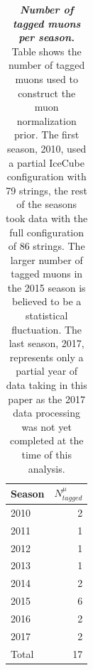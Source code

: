 \begin{table}
	\centering
	\begin{tabular}{l r}
		\toprule
		Season & $N^\mu_{tagged}$ \\
		\midrule
		2010 & 2 \\
		2011 & 1 \\
		2012 & 1 \\
		2013 & 1 \\
		2014 & 2 \\
		2015 & 6 \\
		2016 & 2 \\
		2017 & 2 \\
		\midrule
		Total & 17 \\
		\bottomrule
	\end{tabular}
	\internallinenumbers
	\caption{\textbf{\textit{Number of tagged muons per season.}}
		Table shows the number of tagged muons used to construct the muon normalization prior.
		The first season, 2010, used a partial IceCube configuration with 79 strings, the rest of the seasons took data with the full configuration of 86 strings.
		The larger number of tagged muons in the 2015 season is believed to be a statistical fluctuation.
		The last season, 2017, represents only a partial year of data taking in this paper as the 2017 data processing was not yet completed at the time of this analysis.}\label{tbl:tag_muons}
\end{table}
